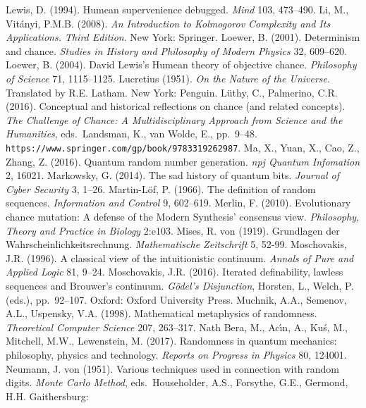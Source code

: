 \documentclass[12pt]{article}
\numberwithin{equation}{section}
\begin{document}
\begin{thebibliography}{99}
\bibitem{} Lewis, D. (1994). Humean supervenience debugged. \emph{Mind} 103, 473--490. 
    \bibitem{}   Li, M., Vit\'{a}nyi, P.M.B. (2008). \emph{An Introduction to Kolmogorov Complexity and Its Applications. Third Edition}.
    New York: Springer. 
     \bibitem{} Loewer, B. (2001). Determinism and chance.    \emph{Studies in History and Philosophy of Modern Physics} 32, 609--620.
  \bibitem{} Loewer, B. (2004). David Lewis's Humean theory of objective chance. \emph{Philosophy of Science} 71, 1115--1125.    
\bibitem{}  Lucretius (1951). \emph{On the Nature of the Universe}. Translated by R.E. Latham. New York: Penguin.     
\bibitem{}  L\"{u}thy, C., Palmerino, C.R. (2016). Conceptual and historical reflections on chance (and related concepts). 
 \emph{The Challenge of Chance: A Multidisciplinary Approach from Science and the Humanities}, eds.\  Landsman, K., van Wolde, E.,  pp.\ 9--48.  \verb#https://www.springer.com/gp/book/9783319262987#.
    \bibitem{} Ma, X., Yuan, X., Cao, Z., Zhang, Z. (2016).   Quantum random number generation. \emph{npj Quantum Infomation} 2, 16021.
        \bibitem{} Markowsky, G. (2014). The sad history of quantum bits. \emph{Journal of Cyber Security} 3, 1--26.
         \bibitem{} Martin-L\"{o}f, P. (1966). The definition of random sequences. \emph{Information and Control} 9, 602--619.        
        \bibitem{} Merlin, F. (2010). Evolutionary chance mutation: A defense of the Modern Synthesis' consensus view. 
        \emph{Philosophy, Theory and Practice in Biology} 2:e103.
        \bibitem{} Mises, R. von (1919).  {Grundlagen der Wahrscheinlichkeitsrechnung}.
        \emph{Mathematische Zeitschrift} 5, 52-99.
  \bibitem{}   Moschovakis, J.R. (1996). A classical view of the intuitionistic continuum. \emph{Annals of Pure and Applied Logic} 81, 9--24.
  \bibitem{}   Moschovakis, J.R. (2016).  Iterated definability, lawless sequences and Brouwer's continuum.
 \emph{G\"{o}del's Disjunction}, Horsten, L., Welch, P. (eds.), pp.\  92--107. Oxford: Oxford University Press. 
\bibitem{} Muchnik, A.A., Semenov, A.L.,  Uspensky, V.A. (1998). Mathematical metaphysics of randomness. 
\emph{Theoretical Computer Science} 207, 263--317. 
        \bibitem{}  Nath Bera, M., Ac\'{\i}n, A.,  Ku\'{s}, M., Mitchell, M.W.,   Lewenstein, M. (2017).  Randomness in quantum mechanics: philosophy, physics and technology.  \emph{Reports on Progress in Physics} 80, 124001.
          \bibitem{} Neumann, J. von (1951).   Various techniques used in connection with random digits.
\emph{Monte Carlo Method}, eds.\ Householder, A.S.,  Forsythe,  G.E., Germond, H.H.  Gaithersburg:

\end{thebibliography}
\end{document}

